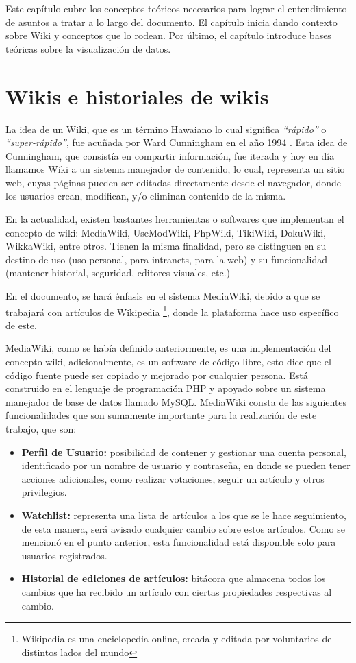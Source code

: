 Este capítulo cubre los conceptos teóricos necesarios para lograr el entendimiento de asuntos a tratar a lo largo del documento. El capítulo inicia dando contexto sobre Wiki y conceptos que lo rodean. Por último, el capítulo introduce bases teóricas sobre la visualización de datos.

\section{Wikis e historiales de wikis}
La idea de un Wiki, que es un término Hawaiano lo cual significa \textit{“rápido”} o \textit{“super-rápido”}, fue acuñada por Ward Cunningham en el año 1994 \cite{Wiki}.
Esta idea de Cunningham, que consistía en compartir información, fue iterada y hoy en día llamamos Wiki a un sistema manejador de contenido, lo cual, representa un sitio web, cuyas páginas pueden ser editadas directamente desde el navegador, donde los usuarios crean, modifican, y/o eliminan contenido de la misma.

En la actualidad, existen bastantes herramientas o softwares que implementan el concepto de wiki: MediaWiki, UseModWiki, PhpWiki, TikiWiki, DokuWiki, WikkaWiki, entre otros. Tienen la misma finalidad, pero se distinguen en su destino de uso (uso personal, para intranets, para la web) y su funcionalidad (mantener historial, seguridad, editores visuales, etc.)

En el documento, se hará énfasis en el sistema MediaWiki, debido a que se trabajará con artículos de Wikipedia \footnote{Wikipedia es una enciclopedia online, creada y editada por voluntarios de distintos lados del mundo}, donde la plataforma hace uso específico de este.

MediaWiki, como se había definido anteriormente, es una implementación del concepto wiki, adicionalmente, es un software de código libre, esto dice que el código fuente puede ser copiado y mejorado por cualquier persona. Está construido en el lenguaje de programación PHP y apoyado sobre un sistema manejador de base de datos llamado MySQL. MediaWiki consta de las siguientes funcionalidades que son sumamente importante para la realización de este trabajo, que son:

\begin{itemize}
    \item\textbf{Perfil de Usuario:} posibilidad de contener y gestionar una cuenta personal, identificado por un nombre de usuario y contraseña, en donde se pueden tener acciones adicionales, como realizar votaciones, seguir un artículo y otros privilegios.
    
    \item\textbf{Watchlist:} representa una lista de artículos a los que se le hace seguimiento, de esta manera, será avisado cualquier cambio sobre estos artículos. Como se mencionó en el punto anterior, esta funcionalidad está disponible solo para usuarios registrados.
    
    \item\textbf{Historial de ediciones de artículos:} bitácora que almacena todos los cambios que ha recibido un artículo con ciertas propiedades respectivas al cambio.
\end{itemize}

